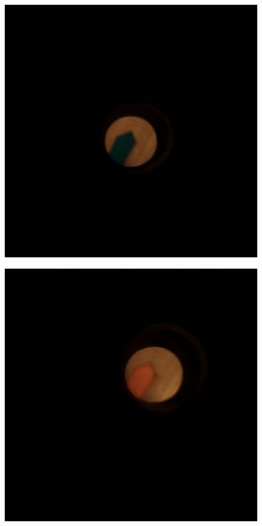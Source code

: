\documentclass[14pt, a4paper]{report}
\begin{document}
\begin{enumerate}
\begin{figure}[H]
\includegraphics[scale=0.2]{../images/473_7}
\end{figure}
\begin{figure}[H]
\centering
\includegraphics[scale=0.2]{../images/473_8}

\end{figure}
\end{enumerate}
\end{document}
